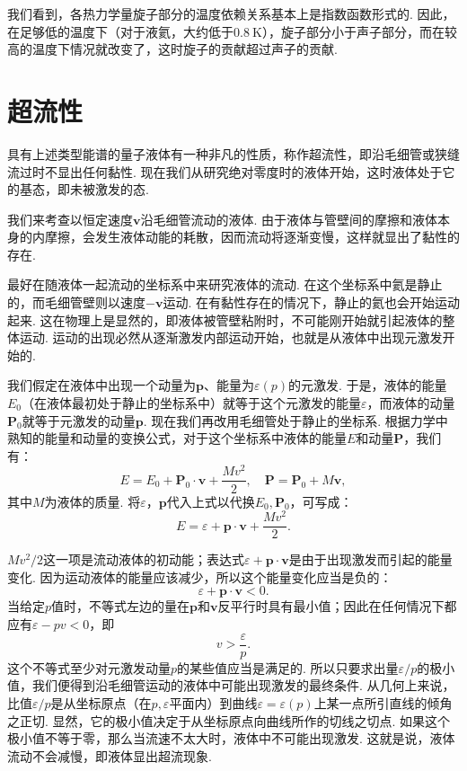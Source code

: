 我们看到，各热力学量旋子部分的温度依赖关系基本上是指数函数形式的. 因此，在足够低的温度下（对于液氦，大约低于$0.8\ \mathrm{K}$），旋子部分小于声子部分，而在较高的温度下情况就改变了，这时旋子的贡献超过声子的贡献.

\section{超流性}

具有上述类型能谱的量子液体有一种非凡的性质，称作超流性，即沿毛细管或狭缝流过时不显出任何黏性. 现在我们从研究绝对零度时的液体开始，这时液体处于它的基态，即未被激发的态.

我们来考查以恒定速度$\bm{v}$沿毛细管流动的液体. 由于液体与管壁间的摩擦和液体本身的内摩擦，会发生液体动能的耗散，因而流动将逐渐变慢，这样就显出了黏性的存在.

最好在随液体一起流动的坐标系中来研究液体的流动. 在这个坐标系中氦是静止的，而毛细管壁则以速度$-\bm{v}$运动. 在有黏性存在的情况下，静止的氦也会开始运动起来. 这在物理上是显然的，即液体被管壁粘附时，不可能刚开始就引起液体的整体运动. 运动的出现必然从逐渐激发内部运动开始，也就是从液体中出现元激发开始的.

我们假定在液体中出现一个动量为$\bm{p}$、能量为$\varepsilon(p)$的元激发. 于是，液体的能量$E_{0}$（在液体最初处于静止的坐标系中）就等于这个元激发的能量$\varepsilon$，而液体的动量$\bm{P}_{0}$就等于元激发的动量$\bm{p}$. 现在我们再改用毛细管处于静止的坐标系. 根据力学中熟知的能量和动量的变换公式，对于这个坐标系中液体的能量$E$和动量$\bm{P}$，我们有：
\begin{equation}
E=E_{0}+\bm{P}_{0}\cdot\bm{v}+\frac{Mv^{2}}{2},\quad
\bm{P}=\bm{P}_{0}+M\bm{v},
\label{23.1}
\end{equation}
其中$M$为液体的质量. 将$\varepsilon$，$\bm{p}$代入上式以代换$E_{0},\bm{P}_{0}$，可写成：
\begin{equation}
E=\varepsilon+\bm{p}\cdot\bm{v}+\frac{Mv^{2}}{2}.
\label{23.2}
\end{equation}

$Mv^{2}/2$这一项是流动液体的初动能；表达式$\varepsilon+\bm{p}\cdot\bm{v}$是由于出现激发而引起的能量变化. 因为运动液体的能量应该减少，所以这个能量变化应当是负的：
\begin{equation*}
\varepsilon+\bm{p}\cdot\bm{v}<0.
\end{equation*}
当给定$p$值时，不等式左边的量在$\bm{p}$和$\bm{v}$反平行时具有最小值；因此在任何情况下都应有$\varepsilon-pv<0$，即
\begin{equation}
v>\frac{\varepsilon}{p}.
\label{23.3}
\end{equation}
这个不等式至少对元激发动量$p$的某些值应当是满足的. 所以只要求出量$\varepsilon/p$的极小值，我们便得到沿毛细管运动的液体中可能出现激发的最终条件. 从几何上来说，比值$\varepsilon/p$是从坐标原点（在$p,\varepsilon$平面内）到曲线$\varepsilon=\varepsilon(p)$上某一点所引直线的倾角之正切. 显然，它的极小值决定于从坐标原点向曲线所作的切线之切点. 如果这个极小值不等于零，那么当流速不太大时，液体中不可能出现激发. 这就是说，液体流动不会减慢，即液体显出超流现象.

